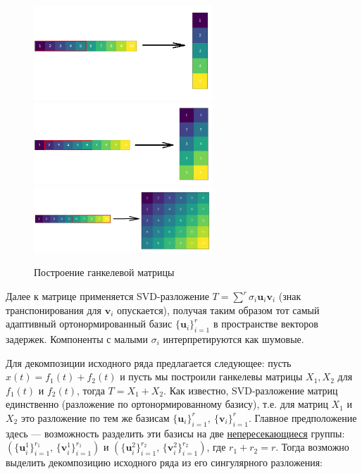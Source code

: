 	    	\begin{figure}
	    		\centering
	    		\includegraphics[width=0.6\textwidth, keepaspectratio]{../figs/first_round}
	    		\includegraphics[width=0.6\textwidth, keepaspectratio]{../figs/second_round.png}
	    		\includegraphics[width=0.6\textwidth, keepaspectratio]{../figs/last_round.png}
	    		\caption{Построение ганкелевой матрицы}\label{pic:hankel_build}
	    	\end{figure}
	    	
	    	Далее к матрице применяется SVD-разложение $ T = \sum\limits^{r} \sigma_i \mathbf{u}_i \mathbf{v}_i $ (знак транспонирования для $ \mathbf{v}_i $ опускается), получая таким образом тот самый адаптивный ортонормированный базис $ \{\mathbf{u}_i\}_{i=1}^r $ в пространстве векторов задержек. Компоненты с малыми $ \sigma_i $ интерпретируются как шумовые.
	    	
	    	Для декомпозиции исходного ряда предлагается следующее: пусть $ x(t) = f_1(t) + f_2(t) $ и пусть мы построили ганкелевы матрицы $ X_1, X_2 $ для $ f_1(t) $ и $ f_2(t) $, тогда $ T = X_1 + X_2 $. Как известно, SVD-разложение матриц единственно (разложение по ортонормированному базису), т.е. для матриц $ X_1 $ и $ X_2 $ это разложение по тем же базисам $ \{\mathbf{u}_i\}_{i=1}^r, \  \{\mathbf{v}_i\}_{i=1}^r $. Главное предположение здесь --- возможность разделить эти базисы на две \underline{непересекающиеся} группы:  $ ( \{\mathbf{u}^1_i\}_{i=1}^{r_1}, \, \{\mathbf{v}^1_i\}_{i=1}^{r_1} ) $ и $ ( \{\mathbf{u}^2_i\}_{i=1}^{r_2}, \, \{\mathbf{v}^2_i\}_{i=1}^{r_2} ) $, где $ r_1 + r_2 = r $. Тогда возможно выделить декомпозицию исходного ряда из его сингулярного разложения:
	    	
